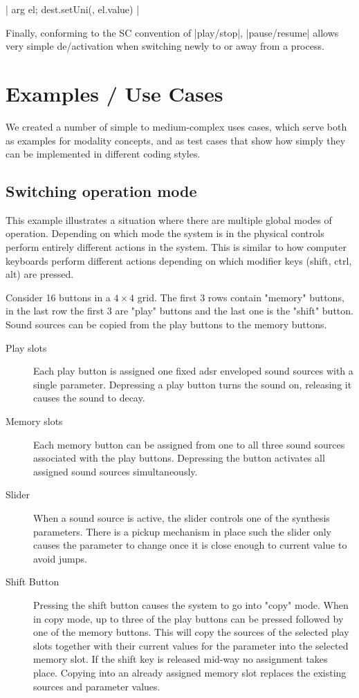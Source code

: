 \documentclass{article}
\begin{document}
|{ arg el; dest.setUni(\amp, el.value) }|

Finally, conforming to the SC convention of |play/stop|, |pause/resume| allows very simple de/activation when switching newly to or away from a process. 

\section{Examples / Use Cases}
\label{sec:examples_use_cases}

We created a number of simple to medium-complex uses cases, which serve both as examples for modality concepts, and as test cases that show how simply they can be implemented in different coding styles. 

\subsection{Switching operation mode}
\label{sub:mpd_18}

This example illustrates a situation where there are multiple global  modes of operation. Depending on which mode the system is in the physical controls perform entirely different actions in the system. This is similar to how computer keyboards perform different actions depending on which modifier keys (shift, ctrl, alt) are pressed.

Consider 16 buttons in a $4\times4$ grid. The first 3 rows contain "memory" buttons, in the last row the first 3 are "play" buttons and the last one is the "shift" button.   Sound sources can be copied from the play buttons to the memory buttons.

\begin{description}
 \item [Play slots]  Each play button is assigned one fixed adsr enveloped sound sources with a single parameter. Depressing a play button turns the sound on, releasing it causes the sound to decay. 
 \item [Memory slots] Each memory button can be assigned from one to all three sound sources associated with the play buttons. Depressing the button activates all assigned sound sources simultaneously.
 \item [Slider] When a sound source is active, the slider controls one of the synthesis parameters. There is a pickup mechanism in place such  the slider only causes the parameter to change once it is close enough to current value to avoid jumps. 
 \item [Shift Button] Pressing the shift button causes the system to go into "copy" mode. When in copy mode, up to three of the play buttons can be pressed followed by one of the memory buttons. This will copy the sources of the selected play slots together with their current values for the parameter into the selected memory slot. If the shift key is released mid-way no assignment takes place. Copying into an already assigned memory slot replaces the existing sources and parameter values.
\end{description}
\end{document}
